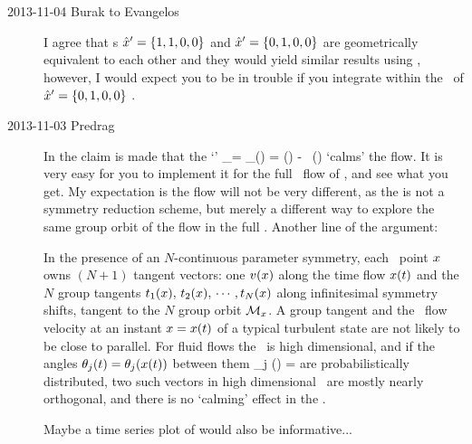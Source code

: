 \begin{description}

\item[2013-11-04 Burak to Evangelos]
I agree that \template s ${\hat{x}'} = \{1,1,0,0\}$ and ${\hat{x}'} = \{0,1,0,0\}$
are geometrically equivalent to each other and they would yield similar results
using \mframes, however, I would expect you to be in trouble if you integrate
within the \slice\ of ${\hat{x}'} = \{0,1,0,0\}$ .

\item[2013-11-03 Predrag]
In  the claim is made that the `{\mconn}'
\beq
	\dot{\ssp}_\perp = \vel_\perp(\ssp) = \vel(\ssp)
    - 
      \, \groupTan(\ssp)
`calms' the flow. It is very easy for you to implement it for the full
\statesp\ flow of , and see what you get. My
expectation is the flow will not be very different, as the {\mconn} is
not a symmetry reduction scheme, but merely a different way to explore
the same group orbit of the flow in the full \statesp. Another line of
the argument:

In the presence of an $N$-continuous parameter symmetry, each \statesp\
point $x$ owns $(N\!+\!1)$ tangent vectors: one $v(x)$ along the
time flow $x(t)$ and the $N$ group tangents  $t_1(x),
\, t_2(x) ,\,\cdots, t_N(x)$ along infinitesimal
symmetry shifts, tangent to the {$N$\dmn} group orbit ${\cal M}_{x}$.
A group tangent and the \statesp\ flow velocity at an instant $x=
x(t)$ of a typical turbulent state are not likely to be close
to parallel. For fluid flows the \statesp\ is high dimensional, and
if the angles $\theta_j (t)= \theta_j (x(t))$ between them
\beq
\cos \theta_j (\ssp) =
         {\norm{\vel(\ssp)}}
are probabilistically distributed, two such vectors in high
dimensional \statesp\ are mostly nearly  orthogonal, and there is
no `calming' effect in the {\comovframe}.

Maybe a time series plot of  would also be
informative...


\end{description}
